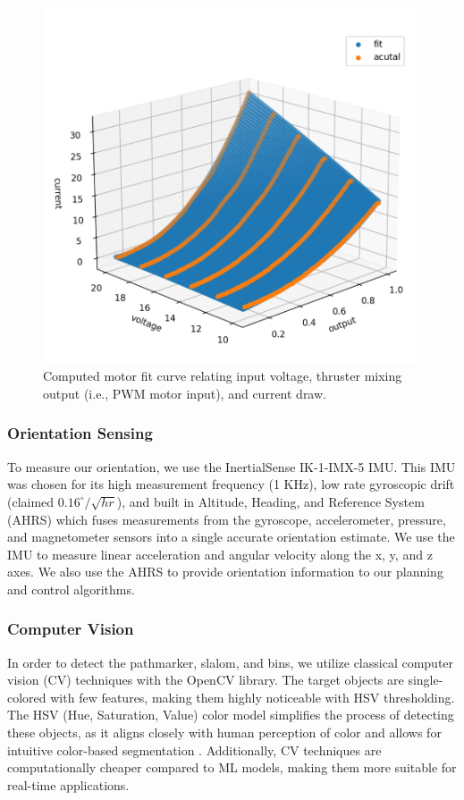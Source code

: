 \documentclass[conference]{IEEEtran}
\begin{document}
\begin{figure}[htbp]
    \centerline{\includegraphics[scale=0.32]{images/motor_fits.png}}
    \caption{Computed motor fit curve relating input voltage, thruster mixing output (i.e., PWM motor input), and current draw.}
    \label{fig:motor_fits}
\end{figure}

\subsubsection{Orientation Sensing}
\label{sssec:orientation_sensing}
To measure our orientation, we use the InertialSense IK-1-IMX-5 IMU. This IMU was chosen for its high measurement frequency (1 KHz), low rate gyroscopic drift (claimed $0.16^{\circ}/\sqrt{hr}$), and built in Altitude, Heading, and Reference System (AHRS) which fuses measurements from the gyroscope, accelerometer, pressure, and magnetometer sensors into a single accurate orientation estimate. We use the IMU to measure linear acceleration and angular velocity along the x, y, and z axes. We also use the AHRS to provide orientation information to our planning and control algorithms.

\subsubsection{Computer Vision}
\label{sssec:cv}
In order to detect the pathmarker, slalom, and bins, we utilize classical computer vision (CV) techniques with the OpenCV library. The target objects are single-colored with few features, making them highly noticeable with HSV thresholding. The HSV (Hue, Saturation, Value) color model simplifies the process of detecting these objects, as it aligns closely with human perception of color and allows for intuitive color-based segmentation \cite{b2}. Additionally, CV techniques are computationally cheaper compared to ML models, making them more suitable for real-time applications.
\end{document}
